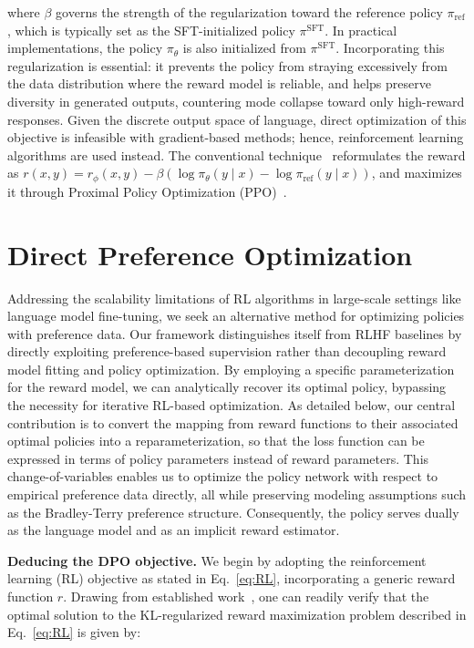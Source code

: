 where $\beta$ governs the strength of the regularization toward the reference policy $\pi_\text{ref}$, which is typically set as the SFT-initialized policy $\pi^\text{SFT}$. In practical implementations, the policy $\pi_\theta$ is also initialized from $\pi^\text{SFT}$. Incorporating this regularization is essential: it prevents the policy from straying excessively from the data distribution where the reward model is reliable, and helps preserve diversity in generated outputs, countering mode collapse toward only high-reward responses. Given the discrete output space of language, direct optimization of this objective is infeasible with gradient-based methods; hence, reinforcement learning algorithms are used instead. The conventional technique~\cite{ziegler2020finetuning, stiennon2022learning, bai2022training, ouyang2022training} reformulates the reward as $r(x, y) = r_{\phi}(x, y) - \beta (\log \pi_{\theta}(y \mid x) - \log \pi_\text{ref}(y \mid x))$, and maximizes it through Proximal Policy Optimization (PPO)~\cite{schulman2017proximal}.

\section{Direct Preference Optimization}\label{sec:DPO}

Addressing the scalability limitations of RL algorithms in large-scale settings like language model fine-tuning, we seek an alternative method for optimizing policies with preference data. Our framework distinguishes itself from RLHF baselines by directly exploiting preference-based supervision rather than decoupling reward model fitting and policy optimization. By employing a specific parameterization for the reward model, we can analytically recover its optimal policy, bypassing the necessity for iterative RL-based optimization. As detailed below, our central contribution is to convert the mapping from reward functions to their associated optimal policies into a reparameterization, so that the loss function can be expressed in terms of policy parameters instead of reward parameters. This change-of-variables enables us to optimize the policy network with respect to empirical preference data directly, all while preserving modeling assumptions such as the Bradley-Terry preference structure. Consequently, the policy serves dually as the language model and as an implicit reward estimator.

\textbf{Deducing the DPO objective.} We begin by adopting the reinforcement learning (RL) objective as stated in Eq.~\ref{eq:RL}, incorporating a generic reward function $r$. Drawing from established work~\citep{peters2007reinforcement, peng2019advantage, korbak2022reinforcement, go2023aligning}, one can readily verify that the optimal solution to the KL-regularized reward maximization problem described in Eq.~\ref{eq:RL} is given by:

